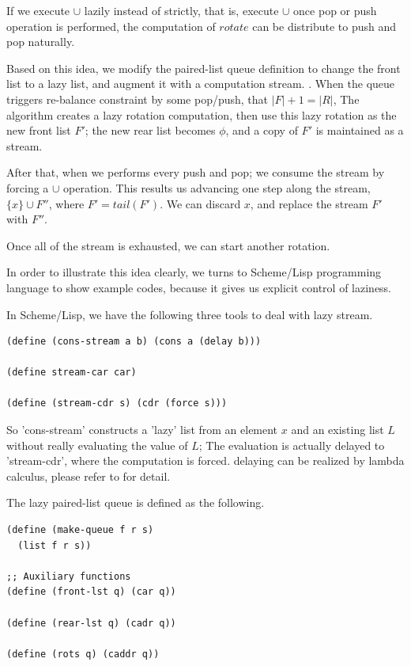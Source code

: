 \documentclass[UTF8]{article}
\begin{document}
If we execute $\cup$ lazily instead of strictly, that is, execute $\cup$
once pop or push operation is performed, the computation of $rotate$ can
be distribute to push and pop naturally.

Based on this idea, we modify the paired-list queue definition to change
the front list to a lazy list, and augment it with a computation stream.
\cite{SICP}. When the queue triggers re-balance constraint by some
pop/push, that
$|F| + 1 = |R|$, The algorithm creates a lazy rotation computation,
then use this lazy rotation as the new front list $F'$; the new rear
list becomes $\phi$, and a copy of $F'$ is maintained as a stream.

After that, when we performs every push and pop; we consume the
stream by forcing a $\cup$ operation. This results us advancing one
step along the stream, $ \{ x \} \cup F''$, where $F' = tail(F')$.
We can discard $x$, and replace the stream $F'$ with $F''$.

Once all of the stream is exhausted, we can start another rotation.

In order to illustrate this idea clearly, we turns to Scheme/Lisp
programming language to show example codes, because it gives us
explicit control of laziness.

In Scheme/Lisp, we have the following three tools to deal with lazy
stream.

\lstset{language=Lisp}
\begin{lstlisting}
(define (cons-stream a b) (cons a (delay b)))

(define stream-car car)

(define (stream-cdr s) (cdr (force s)))
\end{lstlisting}

So 'cons-stream' constructs a 'lazy' list from an element $x$
and an existing list $L$ without really evaluating
the value of $L$; The evaluation is actually delayed to
'stream-cdr', where the computation is forced. delaying can
be realized by lambda calculus, please refer to \cite{SICP} for
detail.

The lazy paired-list queue is defined as the following.

\lstset{language=Lisp}
\begin{lstlisting}
(define (make-queue f r s)
  (list f r s))

;; Auxiliary functions
(define (front-lst q) (car q))

(define (rear-lst q) (cadr q))

(define (rots q) (caddr q))
\end{lstlisting}
\end{document}
